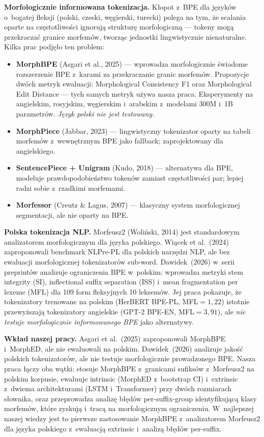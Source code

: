 \textbf{Morfologicznie informowana tokenizacja.} Kłopot z~BPE
dla języków o~bogatej fleksji (polski, czeski, węgierski, turecki)
polega na tym, że scalania oparte na częstotliwości ignorują
strukturę morfologiczną --- tokeny mogą przekraczać granice
morfemów, tworząc jednostki lingwistycznie nienaturalne.
Kilka prac podjęło ten problem:

\begin{itemize}
  \item \textbf{MorphBPE} (Asgari et al., 2025) --- wprowadza
        morfologicznie świadome rozszerzenie BPE z~karami
        za przekraczanie granic morfemów. Propozycje dwóch metryk
        ewaluacji: Morphological Consistency F1 oraz Morphological
        Edit Distance --- tych samych metryk używa nasza praca.
        Eksperymenty na angielskim, rosyjskim, węgierskim
        i~arabskim z~modelami 300M i~1B parametrów.
        \emph{Język polski nie jest testowany.}
  \item \textbf{MorphPiece} (Jabbar, 2023) --- lingwistyczny
        tokenizator oparty na tabeli morfemów z~wewnętrznym BPE
        jako fallback; zaprojektowany dla angielskiego.
  \item \textbf{SentencePiece + Unigram} (Kudo, 2018) --- alternatywa
        dla BPE, modeluje prawdopodobieństwo tokenów zamiast
        częstotliwości par; lepiej radzi sobie z~rzadkimi morfemami.
  \item \textbf{Morfessor} (Creutz \& Lagus, 2007) --- klasyczny
        system morfologicznej segmentacji, ale nie oparty na BPE.
\end{itemize}

\textbf{Polska tokenizacja NLP.} Morfeusz2 (Woliński, 2014)
jest standardowym analizatorem morfologicznym dla języka polskiego.
Wiącek et al.~(2024) zaproponowali benchmark NLPre-PL
dla polskich narzędzi NLP, ale bez ewaluacji morfologicznej
tokenizatorów sub-word. Dawidek~(2026) w~serii preprintów
analizuje ograniczenia BPE w~polskim: wprowadza metryki
stem integrity (SI), inflectional suffix separation (ISS)
i~mean fragmentation per lexeme (MFL) dla 109 form fleksyjnych
10 leksemów. Jej praca pokazuje, że tokenizatory trenowane
na polskim (HerBERT BPE-PL, MFL$=1{,}22$) istotnie przewyższają
tokenizatory angielskie (GPT-2 BPE-EN, MFL$=3{,}91$),
ale \emph{nie testuje morfologicznie informowanego BPE}
jako alternatywy.

\textbf{Wkład naszej pracy.} Asgari et al.~(2025) zaproponowali
MorphBPE i~MorphED, ale nie ewaluowali na polskim. Dawidek~(2026)
analizuje jakość polskich tokenizatorów, ale nie testuje
morfologicznie prowadzonego BPE. Nasza praca łączy oba wątki:
stosuje MorphBPE z~granicami sufiksów z~Morfeusz2 na polskim
korpusie, ewaluuje intrinsic (MorphED z~bootstrap CI)
i~extrinsic z~dwiema architekturami (LSTM i~Transformer)
przy dwóch rozmiarach słownika, oraz przeprowadza analizę
błędów per-suffix-group identyfikującą klasy morfemów,
które zyskują i~tracą na morfologicznym ograniczeniu.
W~najlepszej naszej wiedzy jest to pierwsze zastosowanie
MorphBPE z~analizatorem Morfeusz2 dla języka polskiego
z~ewaluacją extrinsic i~analizą błędów per-suffix.


